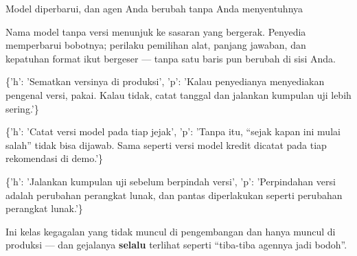 \documentclass[aspectratio=169,11pt,t]{beamer}
\begin{document}
\begin{frame}[shrink=25]{Model diperbarui, dan agen Anda berubah tanpa Anda menyentuhnya}
{\fontsize{9.4}{12.6}\selectfont\color{fg2}Nama model tanpa versi menunjuk ke sasaran yang bergerak. Penyedia memperbarui bobotnya; perilaku pemilihan alat, panjang jawaban, dan kepatuhan format ikut bergeser --- tanpa satu baris pun berubah di sisi Anda.\par}\vskip 4pt
\begin{isteps}
\item \{'h': 'Sematkan versinya di produksi', 'p': 'Kalau penyedianya menyediakan pengenal versi, pakai. Kalau tidak, catat tanggal dan jalankan kumpulan uji lebih sering.'\}
\item \{'h': 'Catat versi model pada tiap jejak', 'p': 'Tanpa itu, ``sejak kapan ini mulai salah'' tidak bisa dijawab. Sama seperti versi model kredit dicatat pada tiap rekomendasi di demo.'\}
\item \{'h': 'Jalankan kumpulan uji sebelum berpindah versi', 'p': 'Perpindahan versi adalah perubahan perangkat lunak, dan pantas diperlakukan seperti perubahan perangkat lunak.'\}
\end{isteps}
\begin{iband}[signal]
Ini kelas kegagalan yang tidak muncul di pengembangan dan hanya muncul di produksi --- dan gejalanya \textbf{selalu} terlihat seperti ``tiba-tiba agennya jadi bodoh''.
\end{iband}
\end{frame}
\end{document}
